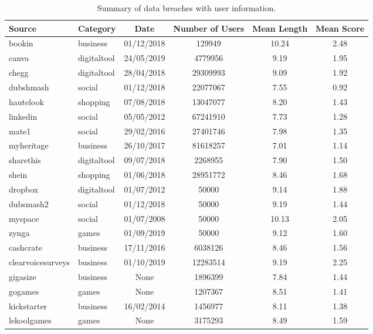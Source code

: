 \begin{table*}[h!]
\centering
\begin{tabular}{|l|l|c|c|c|c|}
\hline
\textbf{Source} & \textbf{Category} & \textbf{Date} & \textbf{Number of Users} & \textbf{Mean Length} & \textbf{Mean Score} \\
\hline
bookin & business & 01/12/2018  & 129949 & 10.24 & 2.48 \\
canva & digitaltool & 24/05/2019  & 4779956 & 9.19 & 1.95 \\
chegg & digitaltool & 28/04/2018  & 29309993 & 9.09 & 1.92 \\
dubshmash & social & 01/12/2018  & 22077067 & 7.55 & 0.92 \\
hautelook & shopping & 07/08/2018  & 13047077 & 8.20 & 1.43 \\
linkedin & social & 05/05/2012  & 67241910 & 7.73 & 1.28 \\
mate1 & social & 29/02/2016  & 27401746 & 7.98 & 1.35 \\
myheritage & business & 26/10/2017  & 81618257 & 7.01 & 1.14 \\
sharethis & digitaltool & 09/07/2018  & 2268955 & 7.90 & 1.50 \\
shein & shopping & 01/06/2018  & 28951772 & 8.46 & 1.68 \\
dropbox & digitaltool & 01/07/2012  & 50000 & 9.14 & 1.88 \\
dubsmash2 & social & 01/12/2018  & 50000 & 9.19 & 1.44 \\
myspace & social & 01/07/2008  & 50000 & 10.13 & 2.05 \\
zynga & games & 01/09/2019  & 50000 & 9.12 & 1.60 \\
cashcrate & business & 17/11/2016  & 6038126 & 8.46 & 1.56 \\
clearvoicesurveys & business & 01/10/2019  & 12283514 & 9.19 & 2.25 \\
gigasize & business & None  & 1896399 & 7.84 & 1.44 \\
gogames & games & None  & 1207367 & 8.51 & 1.41 \\
kickstarter & business & 16/02/2014  & 1456977 & 8.11 & 1.38 \\
lekoolgames & games & None  & 3175293 & 8.49 & 1.59 \\
\hline
\end{tabular}
\caption{Summary of data breaches with user information.}
\end{table*}
